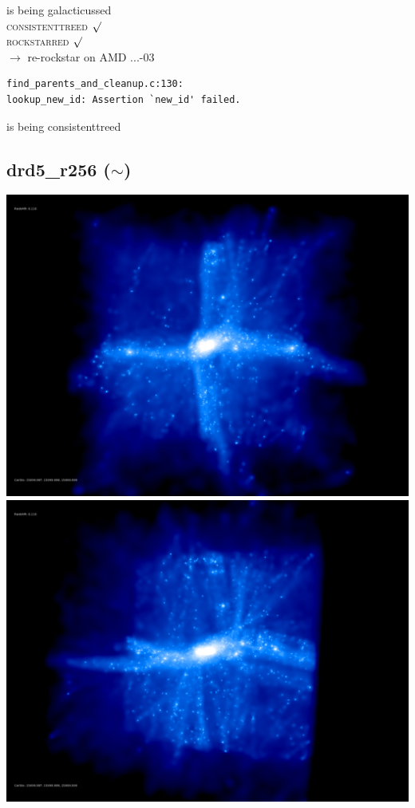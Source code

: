is being galacticussed \\
\textsc{consistenttreed} $\surd$ \\
\textsc{rockstarred} $\surd$ \\
$\rightarrow$  re-rockstar on AMD ...-03 \\
\begin{verbatim}
find_parents_and_cleanup.c:130: 
lookup_new_id: Assertion `new_id' failed.
\end{verbatim}
is being consistenttreed \\ 

% 
%
%
%
%
%
%
%

\newpage

\subsection{drd5\_r256 ($\sim$)} 

\includegraphics[scale=0.12]{r256/drd5_r256/rotate_1.png} 
\includegraphics[scale=0.12]{r256/drd5_r256/rotate_2.png} \\

